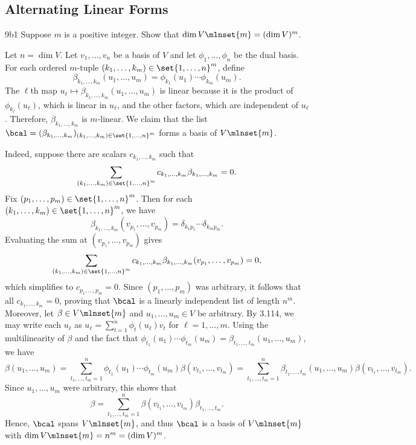 \subsection{Alternating Linear Forms}

\begin{exercise}{9b1}
    Suppose $m$ is a positive integer.
    Show that $\dim V\mlnset{m} = (\dim V)^m$.
\end{exercise}

\begin{sol}
    Let $n = \dim V$.
    Let $v_1, \ldots, v_n$ be a basis of $V$ and let $\phi_1, \ldots, \phi_n$ be the dual basis.
    For each ordered $m$-tuple $(k_1, \ldots, k_m) \in \set{1, \ldots, n}^m$, define
    \[
        \beta_{k_1, \ldots, k_m}(u_1, \ldots, u_m) = \phi_{k_1}(u_1) \cdots \phi_{k_m}(u_m).
    \]
    The $\ell$th map $u_\ell \mapsto \beta_{k_1, \ldots, k_m}(u_1, \ldots, u_m)$ is linear because it is the product of $\phi_{k_\ell}(u_\ell)$, which is linear in $u_\ell$, and the other factors, which are independent of $u_\ell$.
    Therefore, $\beta_{k_1, \ldots, k_m}$ is $m$-linear.
    We claim that the list $\bcal = (\beta_{k_1, \ldots, k_m})_{(k_1, \ldots, k_m) \in \set{1, \ldots, n}^m}$ forms a basis of $V\mlnset{m}$.

    Indeed, suppose there are scalars $c_{k_1, \ldots, k_m}$ such that
    \[
        \sum_{(k_1, \ldots, k_m) \in \set{1, \ldots, n}^m} c_{k_1, \ldots, k_m} \beta_{k_1, \ldots, k_m} = 0.
    \]
    Fix $(p_1, \ldots, p_m) \in \set{1, \ldots, n}^m$.
    Then for each $(k_1, \ldots, k_m) \in \set{1, \ldots, n}^m$, we have
    \[
        \beta_{k_1, \ldots, k_m}(v_{p_1}, \ldots, v_{p_m}) = \delta_{k_1 p_1} \cdots \delta_{k_m p_m}.
    \]
    Evaluating the sum at $(v_{p_1}, \ldots, v_{p_m})$ gives
    \[
        \sum_{(k_1, \ldots, k_m) \in \set{1, \ldots, n}^m} c_{k_1, \ldots, k_m} \beta_{k_1, \ldots, k_m}(v_{p_1}, \ldots, v_{p_m}) = 0,
    \]
    which simplifies to $c_{p_1, \ldots, p_m} = 0$.
    Since $(p_1, \ldots, p_m)$ was arbitrary, it follows that all $c_{k_1, \ldots, k_m} = 0$, proving that $\bcal$ is a linearly independent list of length $n^m$.
    Moreover, let $\beta \in V\mlnset{m}$ and $u_1, \ldots, u_m \in V$ be arbitrary.
    By 3.114, we may write each $u_\ell$ as $u_\ell = \sum_{t=1}^n \phi_t(u_\ell) v_t$ for $\ell = 1, \ldots, m$.
    Using the multilinearity of $\beta$ and the fact that $\phi_{t_1}(u_1) \cdots \phi_{t_m}(u_m) = \beta_{t_1, \ldots, t_m}(u_1, \ldots, u_m)$, we have
    \[
        \beta(u_1, \ldots, u_m) = \sum_{t_1, \ldots, t_m = 1}^n \phi_{t_1}(u_1) \cdots \phi_{t_m}(u_m) \beta(v_{t_1}, \ldots, v_{t_m}) = \sum_{t_1, \ldots, t_m = 1}^n \beta_{t_1, \ldots, t_m}(u_1, \ldots, u_m) \beta(v_{t_1}, \ldots, v_{t_m}).
    \]
    Since $u_1, \ldots, u_m$ were arbitrary, this shows that
    \[
        \beta = \sum_{t_1, \ldots, t_m = 1}^n \beta(v_{t_1}, \ldots, v_{t_m}) \beta_{t_1, \ldots, t_m}.
    \]
    Hence, $\bcal$ spans $V\mlnset{m}$, and thus $\bcal$ is a basis of $V\mlnset{m}$ with $\dim V\mlnset{m} = n^m = (\dim V)^m$.
\end{sol}

